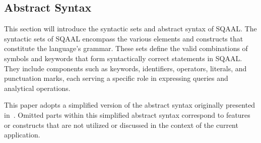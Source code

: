 \subsection{Abstract Syntax} \label{subsec:function-definitions}
This section will introduce the syntactic sets and abstract syntax of SQAAL.
The syntactic sets of SQAAL encompass the various elements and constructs that constitute the language's grammar. These sets define the valid combinations of symbols and keywords that form syntactically correct statements in SQAAL. They include components such as keywords, identifiers, operators, literals, and punctuation marks, each serving a specific role in expressing queries and analytical operations.

This paper adopts a simplified version of the abstract syntax originally presented in~\cite{cortesi_abstract_2013}.
Omitted parts within this simplified abstract syntax correspond to features or constructs that are not utilized or discussed in the context of the current application.
